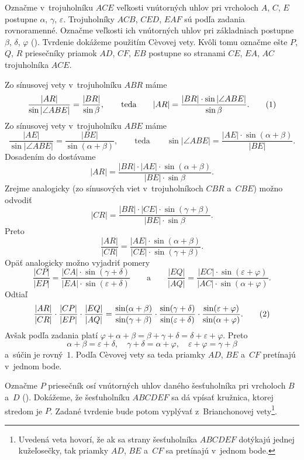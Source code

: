 {%
Označme v~trojuholníku $ACE$ veľkosti vnútorných uhlov pri vrcholoch $A$, $C$, $E$ postupne $\alpha$, $\gamma$, $\varepsilon$. Trojuholníky $ACB$, $CED$, $EAF$ sú podľa zadania rovnoramenné. Označme veľkosti ich vnútorných uhlov pri základniach postupne $\beta$, $\delta$, $\varphi$ (\obr). Tvrdenie dokážeme použitím C\`evovej vety. Kvôli tomu označme ešte $P$, $Q$, $R$ priesečníky priamok $AD$, $CF$, $EB$ postupne so stranami $CE$, $EA$, $AC$ trojuholníka $ACE$.

Zo sínusovej vety v~trojuholníku $ABR$ máme
$$
\frac{|AR|}{\sin|\angle ABE|}=\frac{|BR|}{\sin\beta},\qquad\text{teda}\qquad
|AR|=\frac{|BR|\cdot\sin|\angle ABE|}{\sin\beta}.
\tag1
$$
Zo sínusovej vety v~trojuholníku $ABE$ máme
$$
\frac{|AE|}{\sin|\angle ABE|}=\frac{|BE|}{\sin(\alpha+\beta)},\qquad\text{teda}\qquad
\sin|\angle ABE|=\frac{|AE|\cdot\sin(\alpha+\beta)}{|BE|}.
$$
Dosadením do  dostávame
$$
|AR|=\frac{|BR|\cdot|AE|\cdot\sin(\alpha+\beta)}{|BE|\cdot\sin\beta}.
$$
Zrejme analogicky (zo sínusových viet v~trojuholníkoch $CBR$ a~$CBE$) možno odvodiť
$$
|CR|=\frac{|BR|\cdot|CE|\cdot\sin(\gamma+\beta)}{|BE|\cdot\sin\beta}.
$$
Preto
$$
\frac{|AR|}{|CR|}=\frac{|AE|\cdot\sin(\alpha+\beta)}{|CE|\cdot\sin(\gamma+\beta)}.
$$
Opäť analogicky možno vyjadriť pomery
$$
\frac{|CP|}{|EP|}=\frac{|CA|\cdot\sin(\gamma+\delta)}{|EA|\cdot\sin(\varepsilon+\delta)}
\qquad\text{a}\qquad
\frac{|EQ|}{|AQ|}=\frac{|EC|\cdot\sin(\varepsilon+\varphi)}{|AC|\cdot\sin(\alpha+\varphi)}.
$$
Odtiaľ
$$
\frac{|AR|}{|CR|}\cdot\frac{|CP|}{|EP|}\cdot\frac{|EQ|}{|AQ|}=
\frac{\sin(\alpha+\beta)}{\sin(\gamma+\beta)}\cdot
\frac{\sin(\gamma+\delta)}{\sin(\varepsilon+\delta)}\cdot
\frac{\sin(\varepsilon+\varphi)}{\sin(\alpha+\varphi)}.
\tag2
$$
Avšak podľa zadania platí $\varphi+\alpha+\beta=\beta+\gamma+\delta=\delta+\varepsilon+\varphi$. Preto
$$
\alpha+\beta=\varepsilon+\delta,\quad \gamma+\delta=\alpha+\varphi,\quad \varepsilon+\varphi=\gamma+\beta
$$
a~súčin  je rovný~$1$. Podľa C\`evovej vety sa teda priamky $AD$, $BE$ a~$CF$ pretínajú v~jednom bode.

\ineriesenie
Označme $P$ priesečník osí vnútorných uhlov daného šesťuholníka pri vrcholoch $B$ a~$D$ (\obr). Dokážeme, že šesťuholníku $ABCDEF$ sa dá vpísať kružnica, ktorej stredom je $P$. Zadané tvrdenie bude potom vyplývať z~Brianchonovej vety\footnote{Uvedená veta hovorí, že ak sa strany šesťuholníka $ABCDEF$ dotýkajú jednej kužeľosečky, tak priamky $AD$, $BE$ a~$CF$ sa pretínajú v~jednom bode.}.

}
